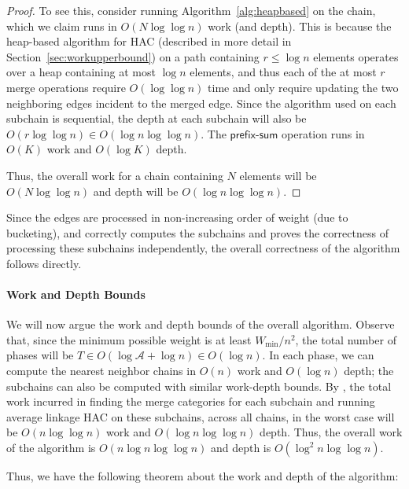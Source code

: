 \begin{proof}
    To see this, consider running Algorithm~\ref{alg:heapbased} on the chain, which we claim runs in $O(N\log\log n)$ work (and depth).
    This is because the heap-based algorithm for HAC (described in more detail in Section~\ref{sec:workupperbound}) on a path containing $r \leq \log n$ elements operates over a heap containing at most $\log n$ elements, and thus each of the at most $r$ merge operations require $O(\log \log n)$ time and only require updating the two neighboring edges incident to the merged edge.
    Since the algorithm used on each subchain is sequential, the depth at each subchain will also be $O(r\log\log n) \in O(\log n\log\log n)$. 
    The $\mathsf{prefix\text{-}sum}$ operation runs in $O(K)$ work and $O(\log K)$ depth. 
    
    Thus, the overall work for a chain containing $N$ elements will be $O(N\log\log n)$ and depth will be $O(\log n\log\log n)$.
\end{proof}

Since the edges are processed in non-increasing order of weight (due to bucketing), and  correctly computes the subchains and proves the correctness of processing these subchains independently, the overall correctness of the algorithm follows directly.

\paragraph{Work and Depth Bounds}
We will now argue the work and depth bounds of the overall algorithm.
Observe that, since the minimum possible weight is at least $W_{\min}/n^2$, the total number of phases will be $T \in O(\log \mathcal{A} + \log n) \in O(\log n)$. 
In each phase, we can compute the nearest neighbor chains in $O(n)$ work and $O(\log n)$ depth; the subchains can also be computed with similar work-depth bounds. By , the total work incurred in finding the merge categories for each subchain and running average linkage HAC on these subchains, across all chains, in the worst case will be $O(n\log\log n)$ work and $O(\log n\log\log n)$ depth. Thus, the overall work of the algorithm is $O(n\log n\log\log n)$ and depth is $O(\log^2n\log\log n)$. 

Thus, we have the following theorem about the work and depth of the algorithm:
\mainUpperPar*

